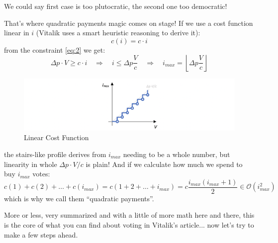 \documentclass[10pt,a4paper]{article}
\begin{document}
	We could say first case is too plutocratic, the second one too democratic!
	
	That’s where quadratic payments magic comes on stage! If we use a cost
	function linear in $i$ (Vitalik uses a smart heuristic reasoning to derive it):
	\begin{equation}\label{eq:3}
		c(i) = c \cdot i
	\end{equation}	
	from the constraint \ref{eq:2} we get:
	\begin{equation*}
		\Delta p \cdot V \geq c \cdot i \quad \Longrightarrow \quad i \leq \Delta p \frac{V}{c} \quad \Longrightarrow \quad i_{max} = \left \lfloor \Delta p \frac{V}{c}\right \rfloor
	\end{equation*}
	\begin{figure}[H]
		\includegraphics[width=\linewidth]{FIG/quadratic.png}
		\caption{Linear Cost Function}
		\label{fig:quadratic}
	\end{figure}
	the stairs-like profile derives from $i_{max}$ needing to be a whole number, but linearity in whole $\Delta p \cdot V/c$ is plain! And if we calculate how much we spend to buy $i_{max}$ votes:
	\begin{equation*}
		c(1)+c(2)+\dots+c(i_{max})=c(1+2+\dots+i_{max})=c \frac{i_{max}(i_{max}+1)}{2} \in \mathcal{O}(i_{max}^2)
	\end{equation*}
	which is why we call them \enquote{quadratic payments}.
	
	More or less, very summarized and with a little of more math here and there, this is the core of what you can find about voting in Vitalik’s article... now let’s try to make a few steps ahead.
	
\end{document}
